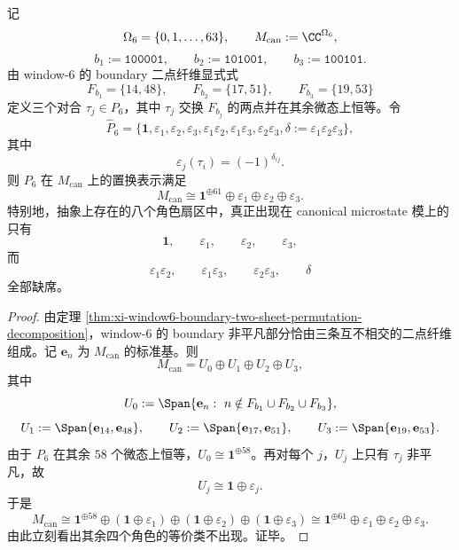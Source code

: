 \begin{theorem}\label{thm:conclusion-window6-canonical-microstate-boundary-character-collapse}
记
\[
\Omega_6=\{0,1,\dots,63\},
\qquad
M_{\mathrm{can}}:=\CC^{\Omega_6},
\]
\[
b_1:=\texttt{100001},
\qquad
b_2:=\texttt{101001},
\qquad
b_3:=\texttt{100101}.
\]
由 window-\(6\) 的 boundary 二点纤维显式式
\[
F_{b_1}=\{14,48\},
\qquad
F_{b_2}=\{17,51\},
\qquad
F_{b_3}=\{19,53\}
\]
定义三个对合 \(\tau_j\in P_6\)，其中 \(\tau_j\) 交换 \(F_{b_j}\) 的两点并在其余微态上恒等。令
\[
\widehat P_6=
\{\mathbf 1,\varepsilon_1,\varepsilon_2,\varepsilon_3,
\varepsilon_1\varepsilon_2,\varepsilon_1\varepsilon_3,\varepsilon_2\varepsilon_3,
\delta:=\varepsilon_1\varepsilon_2\varepsilon_3\},
\]
其中
\[
\varepsilon_j(\tau_i)=(-1)^{\delta_{ij}}.
\]
则 \(P_6\) 在 \(M_{\mathrm{can}}\) 上的置换表示满足
\[
M_{\mathrm{can}}
\cong
\mathbf 1^{\oplus 61}\oplus \varepsilon_1\oplus \varepsilon_2\oplus \varepsilon_3.
\]
特别地，抽象上存在的八个角色扇区中，真正出现在 canonical microstate 模上的只有
\[
\mathbf 1,\qquad \varepsilon_1,\qquad \varepsilon_2,\qquad \varepsilon_3,
\]
而
\[
\varepsilon_1\varepsilon_2,\qquad
\varepsilon_1\varepsilon_3,\qquad
\varepsilon_2\varepsilon_3,\qquad
\delta
\]
全部缺席。
\end{theorem}
\begin{proof}
由定理 \ref{thm:xi-window6-boundary-two-sheet-permutation-decomposition}，window-\(6\) 的 boundary 非平凡部分恰由三条互不相交的二点纤维组成。记 \(\mathbf e_n\) 为 \(M_{\mathrm{can}}\) 的标准基。则
\[
M_{\mathrm{can}}
=
U_0\oplus U_1\oplus U_2\oplus U_3,
\]
其中
\[
U_0:=\Span\{\mathbf e_n:\ n\notin F_{b_1}\cup F_{b_2}\cup F_{b_3}\},
\]
\[
U_1:=\Span\{\mathbf e_{14},\mathbf e_{48}\},
\qquad
U_2:=\Span\{\mathbf e_{17},\mathbf e_{51}\},
\qquad
U_3:=\Span\{\mathbf e_{19},\mathbf e_{53}\}.
\]
由于 \(P_6\) 在其余 \(58\) 个微态上恒等，\(U_0\cong \mathbf 1^{\oplus 58}\)。再对每个 \(j\)，\(U_j\) 上只有 \(\tau_j\) 非平凡，故
\[
U_j\cong \mathbf 1\oplus \varepsilon_j.
\]
于是
\[
M_{\mathrm{can}}
\cong
\mathbf 1^{\oplus 58}\oplus
(\mathbf 1\oplus \varepsilon_1)\oplus
(\mathbf 1\oplus \varepsilon_2)\oplus
(\mathbf 1\oplus \varepsilon_3)
\cong
\mathbf 1^{\oplus 61}\oplus \varepsilon_1\oplus \varepsilon_2\oplus \varepsilon_3.
\]
由此立刻看出其余四个角色的等价类不出现。证毕。
\end{proof}

